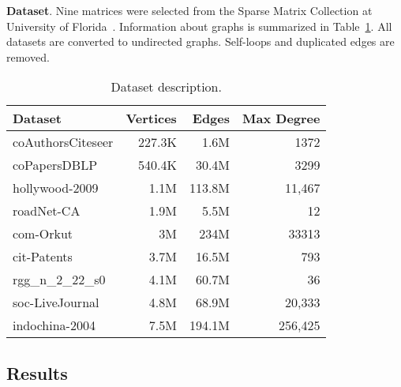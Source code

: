 \textbf{Dataset}. Nine matrices were selected from the Sparse Matrix Collection at University of Florida~\cite{dataset:sparse_matrix_collection}. Information about graphs is summarized in Table~\ref{dataset:info}. All datasets are converted to undirected graphs. Self-loops and duplicated edges are removed.\\

\begin{table}[tbp]
\caption{Dataset description.} 
\begin{center}
    \begin{tabular}{|l|r|r|r|}
    \hline
    Dataset & Vertices  & Edges & Max Degree \\
    \hline
    \hline
    coAuthorsCiteseer & 227.3K &   1.6M &    1372 \\
    coPapersDBLP      & 540.4K &  30.4M &    3299 \\
    hollywood-2009    &   1.1M & 113.8M &  11,467 \\
    roadNet-CA        &   1.9M &   5.5M &      12 \\
    com-Orkut         &     3M &   234M &   33313 \\
    cit-Patents       &   3.7M &  16.5M &     793 \\
    rgg\_n\_2\_22\_s0 &   4.1M &  60.7M &      36 \\
    soc-LiveJournal   &   4.8M &  68.9M &  20,333 \\
    indochina-2004    &   7.5M & 194.1M & 256,425 \\
    \hline
    \end{tabular}
    \label{dataset:info}
\end{center}
\end{table}

\subsection{Results}

